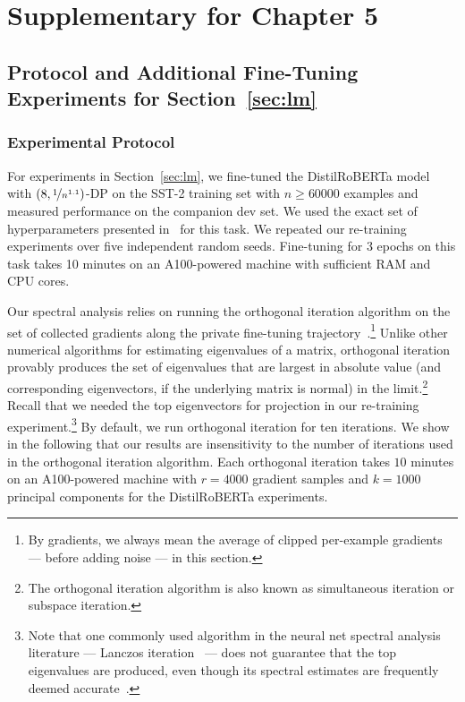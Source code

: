 \clearpage
\newpage
\section{Supplementary for Chapter 5}

\subsection{Protocol and Additional Fine-Tuning Experiments for Section~\ref{sec:lm}} \label{app:exp_privlm}

\subsubsection{Experimental Protocol}
For experiments in Section~\ref{sec:lm}, we fine-tuned the DistilRoBERTa model with $(8, \nicefrac{1}{n^{1.1}})$-DP on the SST-2 training set with $n \ge 60000$ examples and measured performance on the companion dev set.
We used the exact set of hyperparameters presented in~\cite{li2021large} for this task.
We repeated our re-training experiments over five independent random seeds.
Fine-tuning for 3 epochs on this task takes 10 minutes on an A100-powered machine with sufficient RAM and CPU cores.

Our spectral analysis relies on running the orthogonal iteration algorithm on the set of collected gradients along the private fine-tuning trajectory~\cite{demmel1997applied}.\footnote{By gradients, we always mean the average of clipped per-example gradients --- before adding noise --- in this section.}
Unlike other numerical algorithms for estimating eigenvalues of a matrix, orthogonal iteration provably produces the set of eigenvalues that are largest in absolute value (and corresponding eigenvectors, if the underlying matrix is normal) in the limit.\footnote{The orthogonal iteration algorithm is also known as simultaneous iteration or subspace iteration.}
Recall that we needed the top eigenvectors for projection in our re-training experiment.\footnote{
Note that one commonly used algorithm in the neural net spectral analysis literature --- Lanczos iteration~\cite{ghorbani2019investigation} --- does not guarantee that the top eigenvalues are produced, even though its spectral estimates are frequently deemed accurate~\cite{granziol2019deep}.
}
By default, we run orthogonal iteration for ten iterations. 
We show in the following that our results are insensitivity to the number of iterations used in the orthogonal iteration algorithm.
Each orthogonal iteration takes $10$ minutes on an A100-powered machine with $r=4000$ gradient samples and $k=1000$ principal components for the DistilRoBERTa experiments.

